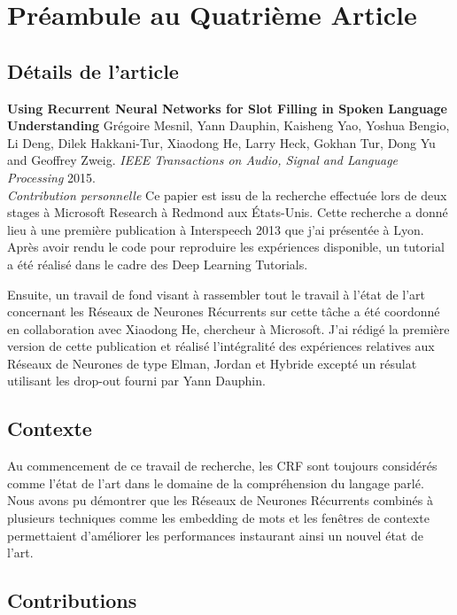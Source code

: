 \chapter{Pr\'{e}ambule au Quatri\`{e}me Article }

\section{D\'{e}tails de l'article}

{\bf Using Recurrent Neural Networks for Slot Filling in Spoken Language
Understanding} Grégoire Mesnil, Yann Dauphin, Kaisheng Yao, Yoshua Bengio, Li
Deng, Dilek Hakkani-Tur, Xiaodong He, Larry Heck, Gokhan Tur, Dong Yu and
Geoffrey Zweig. {\it IEEE Transactions on Audio, Signal and Language
Processing} 2015. \\

{\it Contribution personnelle} Ce papier est issu de la recherche effectuée
lors de deux stages à Microsoft Research à Redmond aux États-Unis. Cette
recherche a donné lieu à une première publication à Interspeech 2013 que j'ai
présentée à Lyon. Après avoir rendu le code pour reproduire les expériences
disponible, un tutorial a été réalisé dans le cadre des Deep Learning
Tutorials.

Ensuite, un travail de fond visant à
rassembler tout le travail à l'état de l'art concernant les Réseaux de Neurones
Récurrents sur cette tâche a été coordonné en collaboration avec Xiaodong He, chercheur à
Microsoft. J'ai rédigé la première version de cette publication et réalisé
l'intégralité des expériences relatives aux Réseaux de Neurones de type Elman,
Jordan et Hybride excepté un résulat utilisant les drop-out fourni par Yann
Dauphin. 


\section{Contexte}

Au commencement de ce travail de recherche, les CRF sont toujours considérés
comme l'état de l'art dans le domaine de la compréhension du langage parlé.
Nous avons pu démontrer que les Réseaux de Neurones Récurrents combinés à
plusieurs techniques comme les embedding de mots et les fenêtres de contexte
permettaient d'améliorer les performances instaurant ainsi un nouvel état de
l'art.

\section{Contributions}

